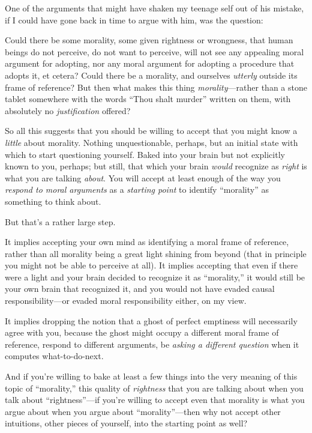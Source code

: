 {
 One of the arguments that might have shaken my teenage self out of
his mistake, if I could have gone back in time to argue with him, was
the question:}

{
 Could there be some morality, some given rightness or wrongness,
that human beings do not perceive, do not want to perceive, will not
see any appealing moral argument for adopting, nor any moral argument
for adopting a procedure that adopts it, et cetera? Could there be a
morality, and ourselves \textit{utterly} outside its frame of
reference? But then what makes this thing \textit{morality}{}---rather
than a stone tablet somewhere with the words ``Thou
shalt murder'' written on them, with absolutely no
\textit{justification} offered?}

{
 So all this suggests that you should be willing to accept that you
might know a \textit{little} about morality. Nothing unquestionable,
perhaps, but an initial state with which to start questioning yourself.
Baked into your brain but not explicitly known to you, perhaps; but
still, that which your brain \textit{would} recognize as \textit{right}
is what you are talking \textit{about}. You will accept at least enough
of the way you \textit{respond to moral arguments} as a
\textit{starting point} to identify
``morality'' as something to think
about.}

{
 But that's a rather large step.}

{
 It implies accepting your own mind as identifying a moral frame of
reference, rather than all morality being a great light shining from
beyond (that in principle you might not be able to perceive at all). It
implies accepting that even if there were a light and your brain
decided to recognize it as
``morality,'' it would still be your
own brain that recognized it, and you would not have evaded causal
responsibility---or evaded moral responsibility either, on my view.}

{
 It implies dropping the notion that a ghost of perfect emptiness
will necessarily agree with you, because the ghost might occupy a
different moral frame of reference, respond to different arguments, be
\textit{asking a different question} when it computes what-to-do-next.}

{
 And if you're willing to bake at least a few
things into the very meaning of this topic of
``morality,'' this quality of
\textit{rightness} that you are talking about when you talk about
``rightness''---if
you're willing to accept even that morality is what you
argue about when you argue about
``morality''---then why not accept
other intuitions, other pieces of yourself, into the starting point as
well?}

